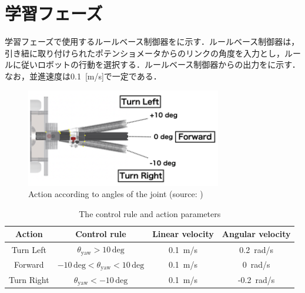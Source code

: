
\section{学習フェーズ}

  学習フェーズで使用するルールベース制御器をに示す．ルールベース制御器は，引き紐に取り付けられたポテンショメータからのリンクの角度を入力とし，ルールに従いロボットの行動を選択する．ルールベース制御器からの出力をに示す．なお，並進速度は0.1 \,[m/s]で一定である．

  \begin{figure}[h]
    \centering
    \includegraphics[keepaspectratio, scale=0.70] {images/okada_rule-based_contoroller.png}
    \caption[Action according to angles of the joint]{Action according to angles of the joint (source: \cite{okada})}
    \label{Fig:okada_rule-based_contoroller}
  \end{figure}

  \begin{table}[ht]
    \caption{The control rule and action parameters}
    \label{tab:actions_control_parameters}
    \centering
    \begin{tabular}{cccc}
    \hline
    Action & Control rule & Linear velocity & Angular velocity \\ 
    \hline
    \hline
    Turn Left & $\theta_{\mathrm{yaw}} > 10 \, \mathrm{deg}$ & 0.1 \,m/s & 0.2 \,rad/s \\ 
    Forward & $-10 \, \mathrm{deg} < \theta_{\mathrm{yaw}} < 10 \, \mathrm{deg}$ & 0.1 \,m/s & 0 \,rad/s \\ 
    Turn Right & $\theta_{\mathrm{yaw}} < -10 \, \mathrm{deg}$ & 0.1 \,m/s & -0.2 \,rad/s \\ 
    \hline
    \end{tabular}
    \end{table}
  
\newpage